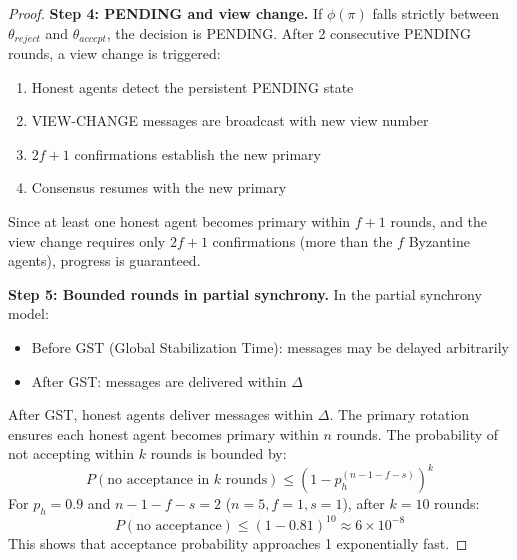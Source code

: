 \documentclass{article}
\begin{document}
\begin{proof}
\textbf{Step 4: PENDING and view change.}
If $\phi(\pi)$ falls strictly between $\theta_{reject}$ and $\theta_{accept}$, the decision is PENDING. After 2 consecutive PENDING rounds, a view change is triggered:
\begin{enumerate}
    \item Honest agents detect the persistent PENDING state
    \item VIEW-CHANGE messages are broadcast with new view number
    \item $2f+1$ confirmations establish the new primary
    \item Consensus resumes with the new primary
\end{enumerate}
Since at least one honest agent becomes primary within $f+1$ rounds, and the view change requires only $2f+1$ confirmations (more than the $f$ Byzantine agents), progress is guaranteed.

\textbf{Step 5: Bounded rounds in partial synchrony.}
In the partial synchrony model:
\begin{itemize}
    \item Before GST (Global Stabilization Time): messages may be delayed arbitrarily
    \item After GST: messages are delivered within $\Delta$
\end{itemize}
After GST, honest agents deliver messages within $\Delta$. The primary rotation ensures each honest agent becomes primary within $n$ rounds. The probability of not accepting within $k$ rounds is bounded by:
\begin{equation}
    P(\text{no acceptance in } k \text{ rounds}) \leq (1 - p_h^{(n-1-f-s)})^k
\end{equation}
For $p_h = 0.9$ and $n-1-f-s = 2$ ($n{=}5, f{=}1, s{=}1$), after $k=10$ rounds:
\begin{equation}
    P(\text{no acceptance}) \leq (1 - 0.81)^{10} \approx 6 \times 10^{-8}
\end{equation}
This shows that acceptance probability approaches 1 exponentially fast.


\end{proof}
\end{document}
